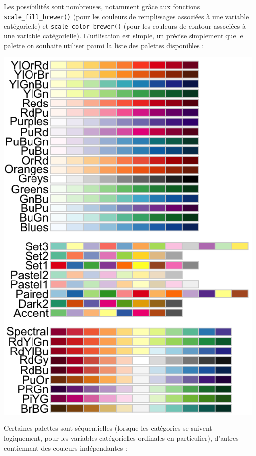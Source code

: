 \documentclass[
  a4paper,
  DIV=11,
  numbers=noendperiod,
  oneside]{scrreprt}
\begin{document}
Les possibilités sont nombreuses, notamment grâce aux fonctions
\texttt{scale\_fill\_brewer()} (pour les couleurs de remplissages
associées à une variable catégorielle) et
\texttt{scale\_color\_brewer()} (pour les couleurs de contour associées
à une variable catégorielle). L'utilisation est simple, un précise
simplement quelle palette on souhaite utiliser parmi la liste des
palettes disponibles :

\includegraphics{images/brewer.png}

Certaines palettes sont séquentielles (lorsque les catégories se suivent
logiquement, pour les variables catégorielles ordinales en particulier),
d'autres contiennent des couleurs indépendantes :
\end{document}
